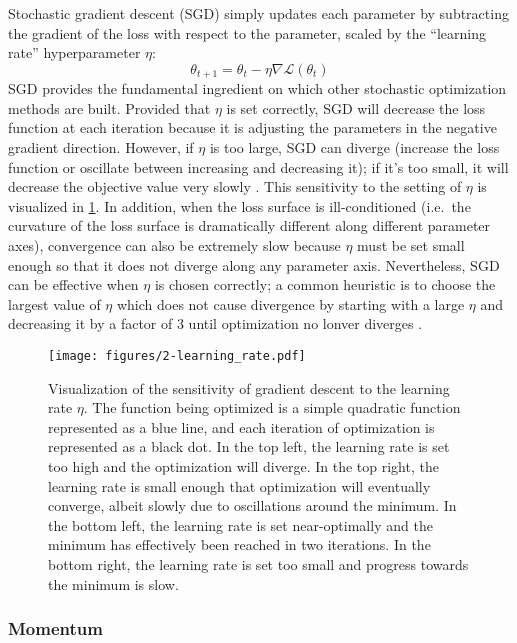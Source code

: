 Stochastic gradient descent (SGD) simply updates each parameter by subtracting the gradient of the loss with respect to the parameter, scaled by the ``learning rate'' hyperparameter $\eta$:
\begin{equation}
\theta_{t + 1} = \theta_t - \eta \nabla \mathcal{L}(\theta_t)
\end{equation}
SGD provides the fundamental ingredient on which other stochastic optimization methods are built.
Provided that $\eta$ is set correctly, SGD will decrease the loss function at each iteration because it is adjusting the parameters in the negative gradient direction.
However, if $\eta$ is too large, SGD can diverge (increase the loss function or oscillate between increasing and decreasing it); if it's too small, it will decrease the objective value very slowly \cite{lecun2012efficient}.
This sensitivity to the setting of $\eta$ is visualized in \cref{fig:learning_rate}.
In addition, when the loss surface is ill-conditioned (i.e.\ the curvature of the loss surface is dramatically different along different parameter axes), convergence can also be extremely slow because $\eta$ must be set small enough so that it does not diverge along any parameter axis.
Nevertheless, SGD can be effective when $\eta$ is chosen correctly; a common heuristic is to choose the largest value of $\eta$ which does not cause divergence by starting with a large $\eta$ and decreasing it by a factor of $3$ until optimization no lonver diverges \cite{bengio2012practical}.

\begin{figure}
  \centering
  \texttt{[image: figures/2-learning\_rate.pdf]}
  \caption[Sensitivity of gradient descent to the learning rate]{Visualization of the sensitivity of gradient descent to the learning rate $\eta$.
  The function being optimized is a simple quadratic function represented as a blue line, and each iteration of optimization is represented as a black dot.
  In the top left, the learning rate is set too high and the optimization will diverge.
  In the top right, the learning rate is small enough that optimization will eventually converge, albeit slowly due to oscillations around the minimum.
  In the bottom left, the learning rate is set near-optimally and the minimum has effectively been reached in two iterations.
  In the bottom right, the learning rate is set too small and progress towards the minimum is slow.}
  \label{fig:learning_rate}
\end{figure}

\subsubsection{Momentum}

